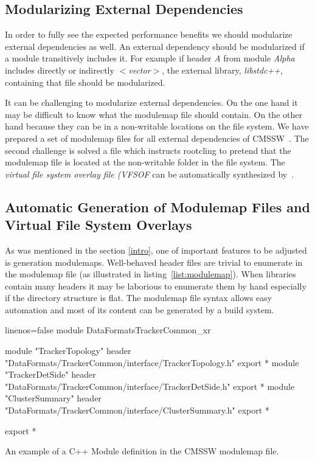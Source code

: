 \documentclass[12pt]{iopart}
\begin{document}
\subsection{Modularizing External Dependencies}

In order to fully see the expected performance benefits we should modularize external dependencies as well. An external dependency should be modularized if a module transitively includes it. For example if header \textit{A} from module \textit{Alpha} includes directly or indirectly \textit{$<$vector$>$}, the external library, \textit{libstdc++}, containing that file should be modularized.

It can be challenging to modularize external dependencies. On the one hand it may be difficult to know what the modulemap file should contain. On the other hand because they can be in a non-writable locations on the file system. We have prepared a set of modulemap files for all external dependencies of CMSSW~\cite{raphael-auto-Modules}. The second challenge is solved a file which instructs rootcling to pretend that the modulemap file is located at the non-writable folder in the file system. The \textit{virtual file system overlay file (VFSOF} can be automatically synthesized by~\cite{raphael-auto-Modules}.

\subsection{Automatic Generation of Modulemap Files and Virtual File System Overlays}


As was mentioned in the section \ref{intro}, one of important features to be adjusted is generation modulemaps. Well-behaved header files are trivial to enumerate in the modulemap file (as illustrated in listing~\ref{list:modulemap}). When libraries contain many headers it may be laborious to enumerate them by hand especially if the directory structure is flat. The modulemap file syntax allows easy automation and most of its content can be generated by a build system.

\begin{listing}[h]
\noindent
\begin{minipage}[h]{\textwidth}
\begin{cppcode*}{linenos=false}
module DataFormatsTrackerCommon_xr {
  module "TrackerTopology" {header "DataFormats/TrackerCommon/interface/TrackerTopology.h" export *}
  module "TrackerDetSide" {header "DataFormats/TrackerCommon/interface/TrackerDetSide.h" export *}
  module "ClusterSummary" {header "DataFormats/TrackerCommon/interface/ClusterSummary.h" export *}

  export *
}
\end{cppcode*}
\end{minipage}
\caption{An example of a C++ Module definition in the CMSSW modulemap file.}
\label{list:modulemap}
\end{listing}
\end{document}
